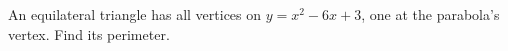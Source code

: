 An equilateral triangle has all vertices on $y=x^2-6x+3$, one at the parabola's vertex. Find its perimeter.
